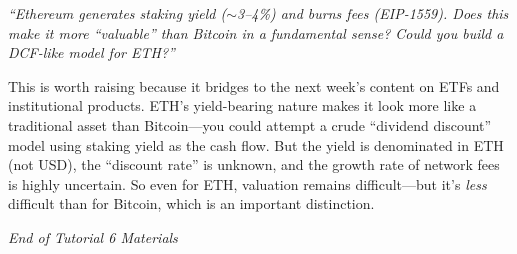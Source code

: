 \documentclass[11pt]{article}
\begin{document}
\textit{``Ethereum generates staking yield ($\sim$3--4\%) and burns fees (EIP-1559). Does this make it more ``valuable'' than Bitcoin in a fundamental sense? Could you build a DCF-like model for ETH?''}

\medskip
This is worth raising because it bridges to the next week's content on ETFs and institutional products. ETH's yield-bearing nature makes it look more like a traditional asset than Bitcoin---you could attempt a crude ``dividend discount'' model using staking yield as the cash flow. But the yield is denominated in ETH (not USD), the ``discount rate'' is unknown, and the growth rate of network fees is highly uncertain. So even for ETH, valuation remains difficult---but it's \textit{less} difficult than for Bitcoin, which is an important distinction.

\vfill
\begin{flushright}
\textit{End of Tutorial 6 Materials}
\end{flushright}
\end{document}
